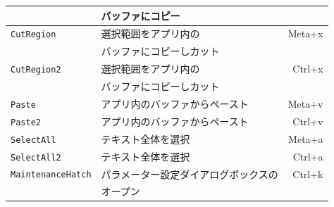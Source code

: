 \begin{table}[h]
\begin{tabular}{llr}
	& バッファにコピー & \\
	\hline
	\texttt{CutRegion} & 選択範囲をアプリ内の & Meta+x\\
	& バッファにコピーしカット & \\
	\hline
	\texttt{CutRegion2} & 選択範囲をアプリ内の & Ctrl+x\\
	& バッファにコピーしカット & \\
	\hline
	\texttt{Paste} & アプリ内のバッファからペースト & Meta+v\\
	\hline
	\texttt{Paste2} & アプリ内のバッファからペースト & Ctrl+v\\
	\hline
	\texttt{SelectAll} & テキスト全体を選択 & Meta+a\\
	\hline
	\texttt{SelectAll2} & テキスト全体を選択 & Ctrl+a\\
	\hline
	\texttt{MaintenanceHatch} & パラメーター設定ダイアログボックスの & Ctrl+k\\
	& オープン & \\
	\hline
	\end{tabular}
\end{table}


